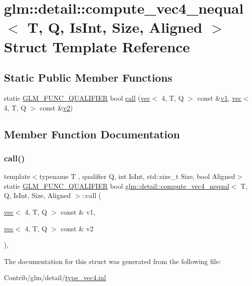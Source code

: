 \hypertarget{structglm_1_1detail_1_1compute__vec4__nequal}{}\section{glm\+:\+:detail\+:\+:compute\+\_\+vec4\+\_\+nequal$<$ T, Q, Is\+Int, Size, Aligned $>$ Struct Template Reference}
\label{structglm_1_1detail_1_1compute__vec4__nequal}
\subsection*{Static Public Member Functions}
\begin{DoxyCompactItemize}
\item 
static \mbox{\hyperlink{setup_8hpp_a33fdea6f91c5f834105f7415e2a64407}{G\+L\+M\+\_\+\+F\+U\+N\+C\+\_\+\+Q\+U\+A\+L\+I\+F\+I\+ER}} bool \mbox{\hyperlink{structglm_1_1detail_1_1compute__vec4__nequal_a3f11c3a7f2b2349d938936b8a68e26b4}{call}} (\mbox{\hyperlink{structglm_1_1vec}{vec}}$<$ 4, T, Q $>$ const \&\mbox{\hyperlink{_s_d_l__opengl__glext_8h_a435c176a02c061b43e19bdf7c86cceae}{v1}}, \mbox{\hyperlink{structglm_1_1vec}{vec}}$<$ 4, T, Q $>$ const \&\mbox{\hyperlink{_s_d_l__opengl__glext_8h_a0928f6d0f0f794ba000a21dfae422136}{v2}})
\end{DoxyCompactItemize}


\subsection{Member Function Documentation}
\mbox{\label{structglm_1_1detail_1_1compute__vec4__nequal_a3f11c3a7f2b2349d938936b8a68e26b4}} 
\subsubsection{\texorpdfstring{call()}{call()}}
{\footnotesize\ttfamily template$<$typename T , qualifier Q, int Is\+Int, std\+::size\+\_\+t Size, bool Aligned$>$ \\
static \mbox{\hyperlink{setup_8hpp_a33fdea6f91c5f834105f7415e2a64407}{G\+L\+M\+\_\+\+F\+U\+N\+C\+\_\+\+Q\+U\+A\+L\+I\+F\+I\+ER}} bool \mbox{\hyperlink{structglm_1_1detail_1_1compute__vec4__nequal}{glm\+::detail\+::compute\+\_\+vec4\+\_\+nequal}}$<$ T, Q, Is\+Int, Size, Aligned $>$\+::call (\begin{DoxyParamCaption}\item[{\mbox{\hyperlink{structglm_1_1vec}{vec}}$<$ 4, T, Q $>$ const \&}]{v1,  }\item[{\mbox{\hyperlink{structglm_1_1vec}{vec}}$<$ 4, T, Q $>$ const \&}]{v2 }\end{DoxyParamCaption})\hspace{0.3cm}{\ttfamily [inline]}, {\ttfamily [static]}}



The documentation for this struct was generated from the following file\+:\begin{DoxyCompactItemize}
\item 
Contrib/glm/detail/\mbox{\hyperlink{type__vec4_8inl}{type\+\_\+vec4.\+inl}}\end{DoxyCompactItemize}
